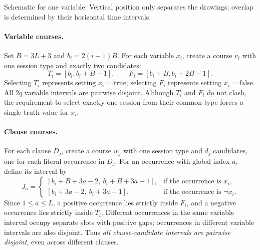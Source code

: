 \documentclass[10pt]{article}
\theoremstyle{definition}
\begin{document}
\begin{center}

\small Schematic for one variable. Vertical position only separates
the drawings; overlap is determined by their horizontal time intervals.
\end{center}

\paragraph{Variable courses.}
Set $B=3L+3$ and $b_i=2(i-1)B$. For each variable $x_i$, create
a course $v_i$ with one session type and exactly two candidates:
\[
  T_i=[b_i,b_i+B-1],
  \qquad
  F_i=[b_i+B,b_i+2B-1].
\]
Selecting $T_i$ represents setting $x_i=\mathrm{true}$; selecting
$F_i$ represents setting $x_i=\mathrm{false}$.
All $2q$ variable intervals are pairwise disjoint. Although $T_i$
and $F_i$ do not clash, the requirement to select exactly one session
from their common type forces a single truth value for $x_i$.

\paragraph{Clause courses.}
For each clause $D_j$, create a course $w_j$ with one session type and
$d_j$ candidates, one for each literal occurrence in $D_j$.
For an occurrence with global index $a$, define its interval by
\[
  J_a=
  \begin{cases}
    [b_i+B+3a-2,\ b_i+B+3a-1], & \text{if the occurrence is }x_i,\\[2pt]
    [b_i+3a-2,\ b_i+3a-1], & \text{if the occurrence is }\neg x_i.
  \end{cases}
\]
Since $1\leq a\leq L$, a positive occurrence lies strictly inside
$F_i$, and a negative occurrence lies strictly inside $T_i$.
Different occurrences in the same variable interval occupy separate
slots with positive gaps; occurrences in different variable intervals
are also disjoint. Thus \emph{all clause-candidate intervals are
pairwise disjoint}, even across different clauses.
\end{document}
